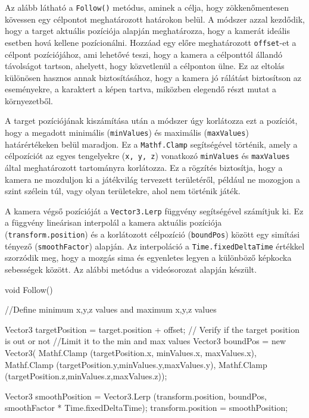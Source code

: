 Az alább látható a \texttt{Follow()} metódus, aminek a  célja, hogy zökkenőmentesen kövessen egy célpontot meghatározott határokon belül. A módszer azzal kezdődik, hogy a target aktuális pozíciója alapján meghatározza, hogy a kamerát ideális esetben hová kellene pozícionálni. Hozzáad egy előre meghatározott \texttt{offset}-et a célpont pozíciójához, ami lehetővé teszi, hogy a kamera a célponttól állandó távolságot tartson, ahelyett, hogy közvetlenül a célponton ülne. Ez az eltolás különösen hasznos annak biztosításához, hogy a kamera jó rálátást biztosítson az eseményekre, a karaktert a képen tartva, miközben elegendő részt mutat a környezetből. 

A target pozíciójának kiszámítása után a módszer úgy korlátozza ezt a pozíciót, hogy a megadott minimális (\texttt{minValues}) és maximális (\texttt{maxValues}) határértékeken belül maradjon. Ez a \texttt{Mathf.Clamp} segítségével történik, amely a célpozíciót az egyes tengelyekre (\texttt{x, y, z}) vonatkozó \texttt{minValues} és \texttt{maxValues} által meghatározott tartományra korlátozza. Ez a rögzítés biztosítja, hogy a kamera ne mozduljon ki a játékvilág tervezett területéről, például ne mozogjon a szint szélein túl, vagy olyan területekre, ahol nem történik játék.

A kamera végső pozícióját a \texttt{Vector3.Lerp} függvény segítségével számítjuk ki. Ez a függvény lineárisan interpolál a kamera aktuális pozíciója (\texttt{transform.position}) és a korlátozott célpozíció (\texttt{boundPos}) között egy simítási tényező (\texttt{smoothFactor}) alapján. Az interpoláció a \texttt{Time.fixedDeltaTime} értékkel szorzódik meg, hogy a mozgás sima és egyenletes legyen a különböző képkocka sebességek között. Az alábbi metódus a \cite{youtubeplaylist} videósorozat alapján készült.

\begin{java}
void Follow()
{
    //Define minimum x,y,z values and maximum x,y,z values

    Vector3 targetPosition = target.position + offset;
    // Verify if the target position is out or not
    //Limit it to the min and max values
    Vector3 boundPos = new Vector3(
        Mathf.Clamp
        (targetPosition.x, minValues.x, maxValues.x),
        Mathf.Clamp
        (targetPosition.y,minValues.y,maxValues.y),
        Mathf.Clamp
        (targetPosition.z,minValues.z,maxValues.z));

    Vector3 smoothPosition = 
        Vector3.Lerp
        (transform.position, boundPos, 
        smoothFactor * Time.fixedDeltaTime);
    transform.position = smoothPosition;
}
\end{java}

